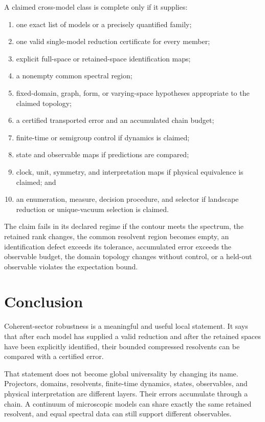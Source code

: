 \documentclass[11pt]{article}
\theoremstyle{definition}
\theoremstyle{remark}
\newcommand{\1}{\mathbf 1}
\begin{document}
A claimed cross-model class is complete only if it supplies:
\begin{enumerate}[leftmargin=2em]
\item one exact list of models or a precisely quantified family;
\item one valid single-model reduction certificate for every member;
\item explicit full-space or retained-space identification maps;
\item a nonempty common spectral region;
\item fixed-domain, graph, form, or varying-space hypotheses appropriate
      to the claimed topology;
\item a certified transported error and an accumulated chain budget;
\item finite-time or semigroup control if dynamics is claimed;
\item state and observable maps if predictions are compared;
\item clock, unit, symmetry, and interpretation maps if physical
      equivalence is claimed; and
\item an enumeration, measure, decision procedure, and selector if
      landscape reduction or unique-vacuum selection is claimed.
\end{enumerate}

The claim fails in its declared regime if the contour meets the spectrum,
the retained rank changes, the common resolvent region becomes empty, an
identification defect exceeds its tolerance, accumulated error exceeds the
observable budget, the domain topology changes without control, or a
held-out observable violates the expectation bound.

\section{Conclusion}
\label{sec:conclusion}

Coherent-sector robustness is a meaningful and useful local statement.
It says that after each model has supplied a valid reduction and after the
retained spaces have been explicitly identified, their bounded compressed
resolvents can be compared with a certified error.

That statement does not become global universality by changing its name.
Projectors, domains, resolvents, finite-time dynamics, states, observables,
and physical interpretation are different layers.  Their errors accumulate
through a chain.  A continuum of microscopic models can share exactly the
same retained resolvent, and equal spectral data can still support
different observables.
\end{document}

